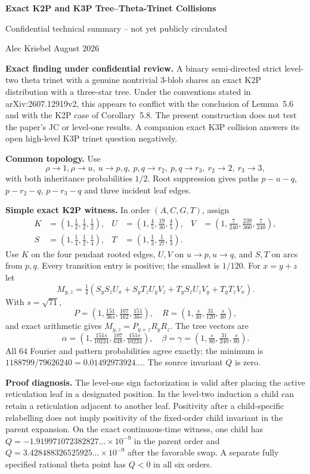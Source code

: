 \documentclass[10pt]{article}
\begin{document}
\begin{center}
{\Large\bfseries Exact K2P and K3P Tree--Theta-Trinet Collisions}\par
{\large Confidential technical summary -- not yet publicly circulated}\par
Alec Kriebel \hfill August 2026
\end{center}
\textbf{Exact finding under confidential review.} A binary semi-directed strict level-two theta trinet with a genuine nontrivial $3$-blob shares an exact K2P distribution with a three-star tree. Under the conventions stated in arXiv:2607.12919v2, this appears to conflict with the conclusion of Lemma~5.6 and with the K2P case of Corollary~5.8. The present construction does not test the paper's JC or level-one results. A companion exact K3P collision answers its open high-level K3P trinet question negatively.

\textbf{Common topology.} Use
\[
\rho\to1,\rho\to u,\ u\to p,q,\ p,q\to r_2,\ p,q\to r_3,\ r_2\to2,\ r_3\to3,
\]
with both inheritance probabilities $1/2$. Root suppression gives paths $p-u-q$, $p-r_2-q$, $p-r_3-q$ and three incident leaf edges.

\textbf{Simple exact K2P witness.} In order $(A,C,G,T)$, assign
\[
\begin{aligned}
K&=(1,\tfrac12,\tfrac12,\tfrac12),&U&=(1,\tfrac45,\tfrac{19}{30},\tfrac45),&V&=(1,\tfrac7{240},\tfrac{239}{360},\tfrac7{240}),\\
S&=(1,\tfrac14,\tfrac12,\tfrac14),&T&=(1,\tfrac13,\tfrac1{27},\tfrac13).
\end{aligned}
\]
Use $K$ on the four pendant rooted edges, $U,V$ on $u\to p,u\to q$, and $S,T$ on arcs from $p,q$. Every transition entry is positive; the smallest is $1/120$. For $x=y+z$ let
\[
M_{y,z}=\tfrac14(S_yS_zU_x+S_yT_zU_yV_z+T_yS_zU_zV_y+T_yT_zV_x).
\]
With $s=\sqrt{71}$,
\[
P=(1,\tfrac{151}{36s},\tfrac{107}{162},\tfrac{151}{36s}),\quad R=(1,\tfrac{s}{40},\tfrac{31}{120},\tfrac{s}{40}),
\]
and exact arithmetic gives $M_{y,z}=P_{y+z}R_yR_z$. The tree vectors are
\[
\alpha=(1,\tfrac{151s}{10224},\tfrac{107}{648},\tfrac{151s}{10224}),\quad
\beta=\gamma=(1,\tfrac{s}{80},\tfrac{31}{240},\tfrac{s}{80}).
\]
All $64$ Fourier and pattern probabilities agree exactly; the minimum is $1188799/79626240=0.01492973924\ldots$. The source invariant $Q$ is zero.

\textbf{Proof diagnosis.} The level-one sign factorization is valid after placing the active reticulation leaf in a designated position. In the level-two induction a child can retain a reticulation adjacent to another leaf. Positivity after a child-specific relabelling does not imply positivity of the fixed-order child invariant in the parent expansion. On the exact continuous-time witness, one child has $Q=-1.919971072382827\ldots\times10^{-9}$ in the parent order and $Q=3.428488326525925\ldots\times10^{-9}$ after the favorable swap. A separate fully specified rational theta point has $Q<0$ in all six orders.
\end{document}
